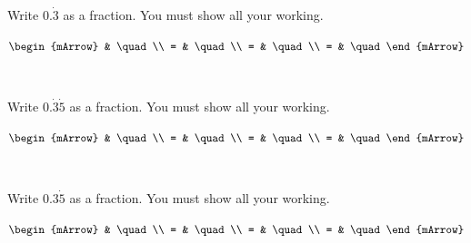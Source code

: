\clearpage\noindent%
\begin{mtask}[resume] 
    \task Write $0.\dot{3}$ as a fraction. You must show all your working.  
	  \begin{exercise} 
         \begin{envSolution}
             $\begin{mArrow}
                          &  \quad      \\
					    = &  \quad                  \\
     				    = &  \quad                    \\ 
            			= &  \quad			
				    \end{mArrow}$			   
                \begin{shortsolution}  
			       $   \quad $
			    \end{shortsolution}				 
        \end{envSolution}
      \end{exercise}
    \task Write $0.\dot{3}\dot{5}$ as a fraction. You must show all your working.  
	  \begin{exercise} 
         \begin{envSolution}
             $\begin{mArrow}
                          &  \quad      \\
					    = &  \quad                  \\
     				    = &  \quad                    \\ 
            			= &  \quad			
				    \end{mArrow}$			   
                \begin{shortsolution}  
			       $   \quad $
			    \end{shortsolution}				 
        \end{envSolution}
      \end{exercise}

    \task Write $0.3\dot{5}$ as a fraction. You must show all your working.  
	  \begin{exercise} 
         \begin{envSolution}
             $\begin{mArrow}
                          &  \quad      \\
					    = &  \quad                  \\
     				    = &  \quad                    \\ 
            			= &  \quad			
				    \end{mArrow}$			   
                \begin{shortsolution}  
			       $   \quad $
			    \end{shortsolution}				 
        \end{envSolution}
      \end{exercise}
	  

\end{mtask}
